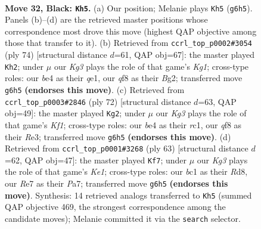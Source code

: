 \documentclass[11pt]{article}
\begin{document}
\clearpage

\begin{figure}[p]\centering
\begin{subfigure}{0.46\textwidth}\centering
\resizebox{\linewidth}{!}{%
\newchessgame
\chessboard[
  setfen={5Q2/p3r3/p3p1k1/8/4B2q/1N6/1P3R2/2B3K1 b - - 1 32},
  showmover=false,
  pgfstyle=straightmove, color=movearrow, markmove={g6-h5}
]}
\caption{}
\end{subfigure}\hfill
\begin{subfigure}{0.46\textwidth}\centering
\resizebox{\linewidth}{!}{%
\newchessgame
\chessboard[
  setfen={4r1k1/5pP1/1pR4Q/7b/P7/7P/6B1/4q1K1 w - - 1 38},
  showmover=false,
  pgfstyle=straightmove, color=movearrow, markmove={g1-h2}
]}
\caption{}
\end{subfigure}
\\[4pt]
\begin{subfigure}{0.46\textwidth}\centering
\resizebox{\linewidth}{!}{%
\newchessgame
\chessboard[
  setfen={3n1k2/Q6p/4b1pP/3rb3/6B1/4R3/P7/2r2K2 w - - 1 37},
  showmover=false,
  pgfstyle=straightmove, color=movearrow, markmove={f1-g2}
]}
\caption{}
\end{subfigure}\hfill
\begin{subfigure}{0.46\textwidth}\centering
\resizebox{\linewidth}{!}{%
\newchessgame
\chessboard[
  setfen={3rk3/p7/6p1/4Qp2/8/4P3/q6P/5RK1 b - - 4 32},
  showmover=false,
  pgfstyle=straightmove, color=movearrow, markmove={e8-f7}
]}
\caption{}
\end{subfigure}
\caption{\textbf{Move 32, Black: \texttt{Kh5}.} (a) Our position; Melanie plays \texttt{Kh5} (\texttt{g6h5}). Panels (b)--(d) are the retrieved master positions whose correspondence most drove this move (highest QAP objective among those that transfer to it). (b) Retrieved from \texttt{ccrl\_top\_p0002\#3054} (ply 74) [structural distance $d$=61, QAP obj=67]: the master played \texttt{Kh2}; under $\mu$ our \emph{Kg3} plays the role of that game's \emph{Kg1}; cross-type roles: our \emph{b}e4 as their \emph{q}e1, our \emph{q}f8 as their \emph{B}g2; transferred move \texttt{g6h5} \textbf{(endorses this move)}. (c) Retrieved from \texttt{ccrl\_top\_p0003\#2846} (ply 72) [structural distance $d$=63, QAP obj=49]: the master played \texttt{Kg2}; under $\mu$ our \emph{Kg3} plays the role of that game's \emph{Kf1}; cross-type roles: our \emph{b}e4 as their \emph{r}c1, our \emph{q}f8 as their \emph{R}e3; transferred move \texttt{g6h5} \textbf{(endorses this move)}. (d) Retrieved from \texttt{ccrl\_top\_p0001\#3268} (ply 63) [structural distance $d$=62, QAP obj=47]: the master played \texttt{Kf7}; under $\mu$ our \emph{Kg3} plays the role of that game's \emph{Ke1}; cross-type roles: our \emph{b}c1 as their \emph{R}d8, our \emph{R}e7 as their \emph{P}a7; transferred move \texttt{g6h5} \textbf{(endorses this move)}. Synthesis: 14 retrieved analogs transferred to \texttt{Kh5} (summed QAP objective 469, the strongest correspondence among the candidate moves); Melanie committed it via the \texttt{search} selector.}
\label{fig:thought-m63}
\end{figure}
\end{document}
